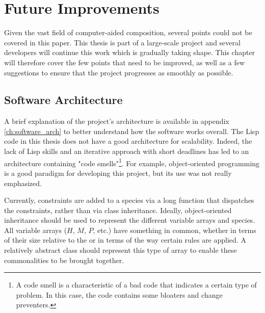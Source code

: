 \chapter{Future Improvements}\label{ch:future}
Given the vast field of computer-aided composition, several points could not be covered in this paper. This thesis is part of a large-scale project and several developers will continue this work which is gradually taking shape. This chapter will therefore cover the few points that need to be improved, as well as a few suggestions to ensure that the project progresses as smoothly as possible.

\section{Software Architecture}
A brief explanation of the project's architecture is available in appendix \ref{ch:software_arch} to better understand how the software works overall. The Lisp code in this thesis does not have a good architecture for scalability. Indeed, the lack of Lisp skills and an iterative approach with short deadlines has led to an architecture containing "code smells"\footnote{A code smell is a characteristic of a bad code that indicates a certain type of problem\parencite{CodeSmells}. In this case, the code contains some bloaters and change preventers\parencite{Guru}.}. For example, object-oriented programming is a good paradigm for developing this project, but its use was not really emphasized.

Currently, constraints are added to a species via a long function that dispatches the constraints, rather than via class inheritance. Ideally, object-oriented inheritance should be used to represent the different variable arrays and species. All variable arrays ($H$, $M$, $P$, etc.) have something in common, whether in terms of their size relative to the \cfcomma or in terms of the way certain rules are applied. A relatively abstract class should represent this type of array to enable these commonalities to be brought together.


